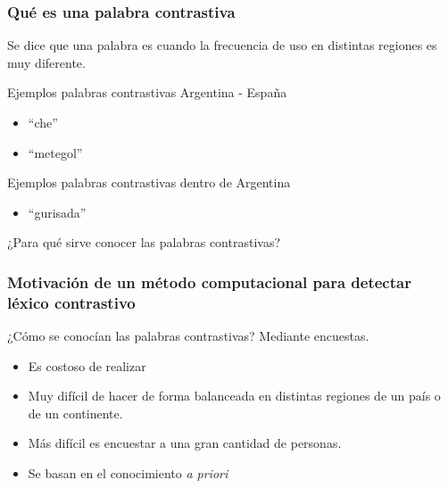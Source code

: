
\begin{frame}[t]\frametitle{Qué es una palabra contrastiva}
    
    Se dice que una palabra es  cuando la frecuencia de uso en distintas regiones es muy diferente. 

    \begin{block}{Ejemplos palabras contrastivas Argentina - España}
    \begin{itemize}
        \item ``che''
        \item ``metegol''
    \end{itemize}
    \end{block}

    \begin{block}{Ejemplos palabras contrastivas dentro de Argentina}
    \begin{itemize}
        \item ``gurisada''
    \end{itemize}
    \end{block}

¿Para qué sirve conocer las palabras contrastivas?

\end{frame}

\begin{frame}[t]\frametitle{Motivación de un método computacional para detectar léxico contrastivo}
    
¿Cómo se conocían las palabras contrastivas?
Mediante encuestas.
\begin{itemize}
    \item Es costoso de realizar
    \item Muy difícil de hacer de forma balanceada en distintas regiones de un país o de un continente.
    \item Más difícil es encuestar a una gran cantidad de personas.
    \item \alert{Se basan en el conocimiento \textit{a priori}}
\end{itemize}
\end{frame}